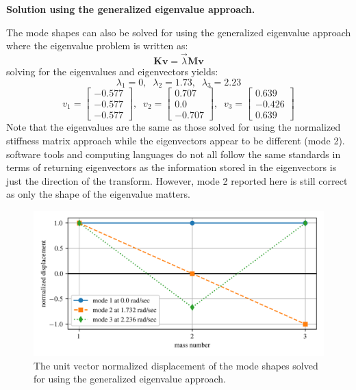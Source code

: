 \documentclass[12pt,letter]{article}
\begin{document}
\begin{example}
	
	
	\vspace{2ex}
	\noindent \textbf{Solution using the generalized eigenvalue approach.}
	\vspace{1ex}
	
	The mode shapes can also be solved for using the generalized eigenvalue approach where the eigenvalue problem is written as:
	\begin{equation}
	\textbf{K}\textbf{v} = \vec{\lambda}\textbf{M}\textbf{v}
	\end{equation}
	solving for the eigenvalues and eigenvectors yields:
	\begin{equation}
	\lambda_1 = 0, \; \; \lambda_2 = 1.73, \; \; \lambda_3 = 2.23
	\end{equation}
	\begin{equation}
	v_1 = \begin{bmatrix} -0.577 \\    -0.577 \\   -0.577  \end{bmatrix}, \; \; v_2 = \begin{bmatrix} 0.707 \\    0.0 \\    -0.707 \end{bmatrix}, \; \; v_3 = \begin{bmatrix} 0.639 \\    -0.426 \\    0.639 \end{bmatrix}
	\end{equation}
	Note that the eigenvalues are the same as those solved for using the normalized stiffness matrix approach while the eigenvectors appear to be different (mode 2). software tools and computing languages do not all follow the same standards in terms of returning eigenvectors as the information stored in the eigenvectors is just the direction of the transform. However, mode 2 reported here is still correct as only the shape of the eigenvalue matters.
	
	\begin{figure}[H]
		\centering
		\includegraphics[width=\linewidth]{../figures/mode_shape_aiplane_example_generalized_eigenvalue.png}
		\caption{The unit vector normalized displacement of the mode shapes solved for using the generalized eigenvalue approach.}
		\label{fig:mode_shape_aiplane_example_generalized_eigenvalue}
	\end{figure}

	\end{example}
	
\end{document}
